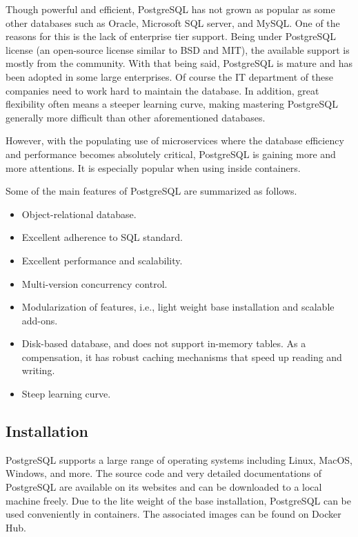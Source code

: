Though powerful and efficient, PostgreSQL has not grown as popular as some other databases such as Oracle, Microsoft SQL server, and MySQL. One of the reasons for this is the lack of enterprise tier support. Being under PostgreSQL license (an open-source license similar to BSD and MIT), the available support is mostly from the community. With that being said, PostgreSQL is mature and has been adopted in some large enterprises. Of course the IT department of these companies need to work hard to maintain the database. In addition, great flexibility often means a steeper learning curve, making mastering PostgreSQL generally more difficult than other aforementioned databases.

However, with the populating use of microservices where the database efficiency and performance becomes absolutely critical, PostgreSQL is gaining more and more attentions. It is especially popular when using inside containers.

Some of the main features of PostgreSQL are summarized as follows.
\begin{itemize}
	\item Object-relational database.
	\item Excellent adherence to SQL standard.
	\item Excellent performance and scalability.
	\item Multi-version concurrency control.
	\item Modularization of features, i.e., light weight base installation and scalable add-ons.
	\item Disk-based database, and does not support in-memory tables. As a compensation, it has robust caching mechanisms that speed up reading and writing.
	\item Steep learning curve.
\end{itemize}

\subsection{Installation}

PostgreSQL supports a large range of operating systems including Linux, MacOS, Windows, and more. The source code and very detailed documentations of PostgreSQL are available on its websites and can be downloaded to a local machine freely. Due to the lite weight of the base installation, PostgreSQL can be used conveniently in containers. The associated images can be found on Docker Hub.

